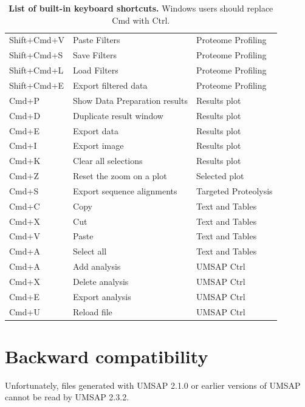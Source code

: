 \begin{table}[h!]
\begin{tabular}{l l l}
        Shift+Cmd+V&Paste Filters                      &Proteome Profiling\\
        Shift+Cmd+S&Save Filters                       &Proteome Profiling\\
        Shift+Cmd+L&Load Filters                       &Proteome Profiling\\
        Shift+Cmd+E&Export filtered data               &Proteome Profiling\\
        Cmd+P      &Show Data Preparation results      &Results plot\\
        Cmd+D      &Duplicate result window            &Results plot\\
        Cmd+E      &Export data                        &Results plot\\
        Cmd+I      &Export image                       &Results plot\\
        Cmd+K      &Clear all selections               &Results plot\\
        Cmd+Z      &Reset the zoom       on a plot     &Selected plot\\
        Cmd+S      &Export sequence alignments         &Targeted Proteolysis\\
        Cmd+C      &Copy                               &Text and Tables\\
        Cmd+X      &Cut                                &Text and Tables\\
        Cmd+V      &Paste                              &Text and Tables\\
        Cmd+A      &Select all                         &Text and Tables\\
        Cmd+A      &Add analysis                       &UMSAP Ctrl\\
        Cmd+X      &Delete analysis                    &UMSAP Ctrl\\
        Cmd+E      &Export analysis                    &UMSAP Ctrl\\
        Cmd+U      &Reload file                        &UMSAP Ctrl\\
        \hline
    \end{tabular}
    \caption[List of built-in keyboard shortcuts]{\textbf{List of built-in keyboard
    shortcuts.} Windows users should replace Cmd with Ctrl.}
    \label{table:shortcuts}
\end{table}

\section{Backward compatibility}
\label{sec:backwardCompatibility}

Unfortunately, files generated with UMSAP 2.1.0 or earlier versions of UMSAP
cannot be read by UMSAP 2.3.2.